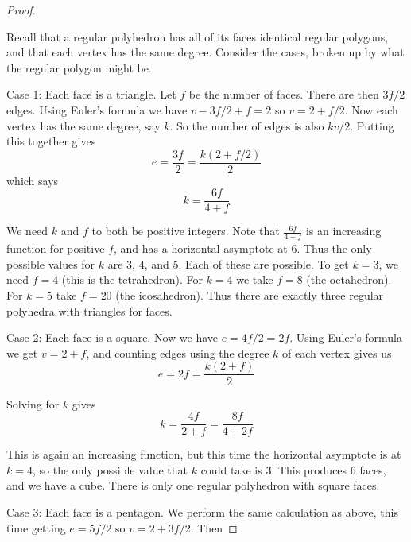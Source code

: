 \documentclass[10pt,]{book}
\theoremstyle{plain}
\theoremstyle{definition}
\theoremstyle{definition}
\theoremstyle{definition}
\theoremstyle{definition}
\numberwithin{equation}{chapter}
\begin{document}
\begin{proof}\hypertarget{proof-7}{}
\hypertarget{p-274}{}%
Recall that a regular polyhedron has all of its faces identical regular polygons, and that each vertex has the same degree. Consider the cases, broken up by what the regular polygon might be.%
\par
\hypertarget{p-275}{}%
Case 1: Each face is a triangle. Let \(f\) be the number of faces. There are then \(3f/2\) edges. Using Euler's formula we have \(v - 3f/2 + f = 2\) so \(v = 2 + f/2\). Now each vertex has the same degree, say \(k\). So the number of edges is also \(kv/2\). Putting this together gives%
\begin{equation*}
e = \frac{3f}{2} = \frac{k(2+f/2)}{2}
\end{equation*}
which says%
\begin{equation*}
k = \frac{6f}{4+f}
\end{equation*}
%
\par
\hypertarget{p-276}{}%
We need \(k\) and \(f\) to both be positive integers. Note that \(\frac{6f}{4+f}\) is an increasing function for positive \(f\), and has a horizontal asymptote at 6. Thus the only possible values for \(k\) are 3, 4, and 5. Each of these are possible. To get \(k = 3\), we need \(f = 4\) (this is the tetrahedron). For \(k = 4\) we take \(f = 8\) (the octahedron). For \(k = 5\) take \(f = 20\) (the icosahedron). Thus there are exactly three regular polyhedra with triangles for faces.%
\par
\hypertarget{p-277}{}%
Case 2: Each face is a square. Now we have \(e = 4f/2 = 2f\). Using Euler's formula we get \(v = 2 + f\), and counting edges using the degree \(k\) of each vertex gives us%
\begin{equation*}
e = 2f = \frac{k(2+f)}{2}
\end{equation*}
%
\par
\hypertarget{p-278}{}%
Solving for \(k\) gives%
\begin{equation*}
k = \frac{4f}{2+f} = \frac{8f}{4+2f}
\end{equation*}
%
\par
\hypertarget{p-279}{}%
This is again an increasing function, but this time the horizontal asymptote is at \(k = 4\), so the only possible value that \(k\) could take is 3. This produces 6 faces, and we have a cube. There is only one regular polyhedron with square faces.%
\par
\hypertarget{p-280}{}%
Case 3: Each face is a pentagon. We perform the same calculation as above, this time getting \(e = 5f/2\) so \(v = 2 + 3f/2\). Then%

\end{proof}
\end{document}
